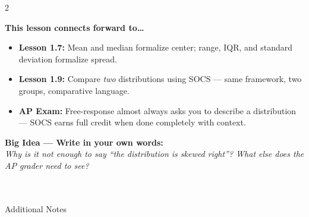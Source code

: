 \documentclass[10pt]{article}
\begin{document}
\begin{spiralbox}
\small
\begin{multicols}{2}

\textbf{This lesson connects forward to\dots}
\begin{itemize}[itemsep=2pt]
  \item \textbf{Lesson 1.7:} Mean and median formalize center; range, IQR,
        and standard deviation formalize spread.
  \item \textbf{Lesson 1.9:} Compare \textit{two} distributions using SOCS ---
        same framework, two groups, comparative language.
  \item \textbf{AP Exam:} Free-response almost always asks you to describe a
        distribution --- SOCS earns full credit when done completely with context.
\end{itemize}

\columnbreak

\textbf{Big Idea --- Write in your own words:}\\
\textit{Why is it not enough to say ``the distribution is skewed right''?
What else does the AP grader need to see?}\\[2pt]
\writeline\\[1pt]\writeline\\[1pt]\writeline

\end{multicols}
\end{spiralbox}

\vspace{0.1in}

\begin{notesbox}{Additional Notes}
\vspace{0pt}
\writeline\\\writeline\\\writeline\\\writeline\\\writeline\\\writeline
\end{notesbox}
\end{document}
